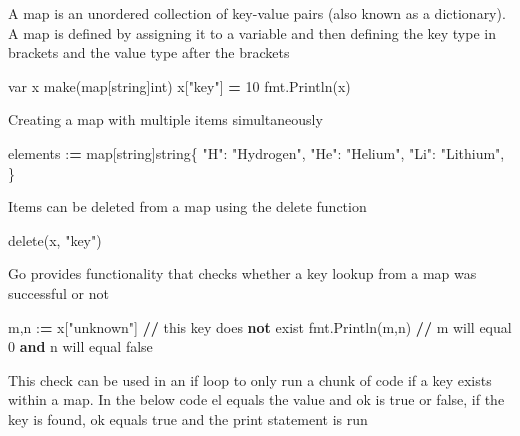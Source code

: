 \documentclass[]{book}
\newenvironment{Shaded}{\begin{snugshade}}{\end{snugshade}}
\newcommand{\KeywordTok}[1]{\textcolor[rgb]{0.13,0.29,0.53}{\textbf{#1}}}
\newcommand{\DecValTok}[1]{\textcolor[rgb]{0.00,0.00,0.81}{#1}}
\newcommand{\StringTok}[1]{\textcolor[rgb]{0.31,0.60,0.02}{#1}}
\newcommand{\OperatorTok}[1]{\textcolor[rgb]{0.81,0.36,0.00}{\textbf{#1}}}
\newcommand{\BuiltInTok}[1]{#1}
\newcommand{\NormalTok}[1]{#1}
\begin{document}
A map is an unordered collection of key-value pairs (also known as a
dictionary). A map is defined by assigning it to a variable and then
defining the key type in brackets and the value type after the brackets

\begin{Shaded}
\begin{Highlighting}[]
\NormalTok{var x make(}\BuiltInTok{map}\NormalTok{[string]}\BuiltInTok{int}\NormalTok{)}
\NormalTok{x[}\StringTok{"key"}\NormalTok{] }\OperatorTok{=} \DecValTok{10} 
\NormalTok{fmt.Println(x)}
\end{Highlighting}
\end{Shaded}

Creating a map with multiple items simultaneously

\begin{Shaded}
\begin{Highlighting}[]
\NormalTok{elements :}\OperatorTok{=} \BuiltInTok{map}\NormalTok{[string]string\{}
  \StringTok{"H"}\NormalTok{:  }\StringTok{"Hydrogen"}\NormalTok{,}
  \StringTok{"He"}\NormalTok{: }\StringTok{"Helium"}\NormalTok{,}
  \StringTok{"Li"}\NormalTok{: }\StringTok{"Lithium"}\NormalTok{,}
\NormalTok{\}}
\end{Highlighting}
\end{Shaded}

Items can be deleted from a map using the delete function

\begin{Shaded}
\begin{Highlighting}[]
\NormalTok{delete(x, }\StringTok{"key"}\NormalTok{)}
\end{Highlighting}
\end{Shaded}

Go provides functionality that checks whether a key lookup from a map
was successful or not

\begin{Shaded}
\begin{Highlighting}[]
\NormalTok{m,n :}\OperatorTok{=}\NormalTok{ x[}\StringTok{"unknown"}\NormalTok{] }\OperatorTok{//}\NormalTok{ this key does }\KeywordTok{not}\NormalTok{ exist}
\NormalTok{fmt.Println(m,n) }\OperatorTok{//}\NormalTok{ m will equal }\DecValTok{0} \KeywordTok{and}\NormalTok{ n will equal false}
\end{Highlighting}
\end{Shaded}

This check can be used in an if loop to only run a chunk of code if a
key exists within a map. In the below code el equals the value and ok is
true or false, if the key is found, ok equals true and the print
statement is run
\end{document}
